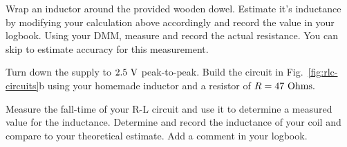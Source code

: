 \begin{measurement}
Wrap an inductor around the provided wooden dowel. Estimate it's
inductance by modifying your calculation above accordingly and record the value in your logbook.  Using your DMM, measure and record the actual resistance. You can skip to estimate accuracy for this measurement.
\end{measurement}


\noindent Turn down the supply to $2.5~\rm V$ peak-to-peak.  Build the circuit in
Fig.~\ref{fig:rlc-circuits}b using your homemade inductor and a
resistor of $R=47~\rm Ohms.$ 
\begin{measurement}
Measure the fall-time of your R-L circuit
and use it to determine a measured value for the inductance.
Determine and record the inductance of your coil and compare to your theoretical
estimate. Add a comment in your logbook. 
\end{measurement}
